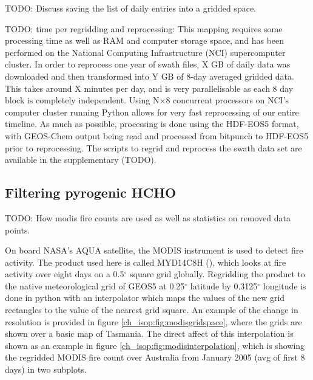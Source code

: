     TODO: Discuss saving the list of daily entries into a gridded space.
    
    TODO: time per regridding and reprocessing:
    This mapping requires some processing time as well as RAM and computer storage space, and has been performed on the National Computing Infrastructure (NCI) supercomputer cluster.
    In order to reprocess one year of swath files, X GB of daily data was downloaded and then transformed into Y GB of 8-day averaged gridded data.
    This takes around X minutes per day, and is very parallelisable as each 8 day block is completely independent.
    Using N$\times 8$ concurrent processors on NCI's computer cluster running Python allows for very fast reprocessing of our entire timeline.
    As much as possible, processing is done using the HDF-EOS5 format, with GEOS-Chem output being read and processed from bitpunch to HDF-EOS5 prior to reprocessing.
    The scripts to regrid and reprocess the swath data set are available in the supplementary (TODO).
    
  \subsection{Filtering pyrogenic HCHO}
    TODO: How modis fire counts are used as well as statistics on removed data points.
    
    On board NASA's AQUA satellite, the MODIS instrument is used to detect fire activity.
    The product used here is called MYD14C8H (\citep{Giglio2006}), which looks at fire activity over eight days on a 0.5$^{\circ}$ square grid globally.
    Regridding the product to the native meteorological grid of GEOS5 at 0.25$^{\circ}$ latitude by 0.3125$^{\circ}$ longitude is done in python with an interpolator which maps the values of the new grid rectangles to the value of the nearest grid square.
    An example of the change in resolution is provided in figure \ref{ch_isop:fig:modisgridspace}, where the grids are shown over a basic map of Tasmania.
    The direct affect of this interpolation is shown as an example in figure \ref{ch_isop:fig:modisinterpolation}, which is showing the regridded MODIS fire count over Australia from January 2005 (avg of first 8 days) in two subplots.
    
